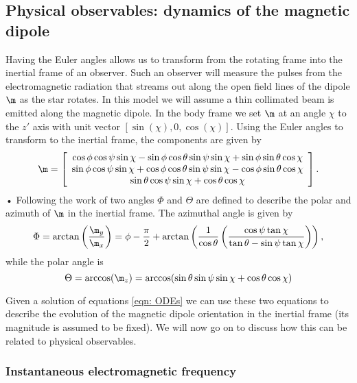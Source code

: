 \documentclass[/home/greg/Thesis/main/main.tex]{subfiles}
\begin{document}
\subsection{Physical observables: dynamics of the magnetic dipole} 
Having the Euler angles allows us to transform from the rotating frame into the
inertial frame of an observer. Such an observer will measure the pulses from
the electromagnetic radiation that streams out along the open field lines of
the dipole $\m$ as the star rotates. In this model we will assume a thin
collimated beam is emitted along the magnetic dipole. In the body frame we
set $\m$ at an angle $\chi$ to the $z'$ axis with unit vector $[\sin(\chi), 0,
\cos(\chi)]$.  Using the Euler angles to transform to the inertial frame, the
components are given by
\begin{equation}
\m = 
\left[\begin{array}{c}
\cos\phi\cos\psi\sin\chi - \sin\phi \cos \theta \sin \psi \sin \chi 
+ \sin \phi \sin \theta \cos \chi \\
\sin\phi\cos\psi\sin\chi + \cos\phi \cos \theta \sin \psi \sin \chi 
- \cos \phi \sin \theta \cos \chi \\
\sin\theta \cos\psi \sin\chi + \cos\theta \cos \chi
\end{array}\right].
\label{eqn: m inertial}
\end{equation}•
Following the work of  two angles $\Phi$ and $\Theta$ are
defined to describe the polar and azimuth of $\m$ in the inertial frame.
The azimuthal angle is given by 
\begin{equation}
    \Phi = \arctan\left(\frac{\m_{y}}{\m_{x}}\right) = 
\phi - \frac{\pi}{2} + \arctan\left(\frac{1}{\cos\theta}
                       \left(\frac{\cos\psi \tan \chi}{\tan\theta - 
                       \sin \psi \tan\chi }\right)\right),
\label{eqn: Phi}
\end{equation}
while the polar angle is
\begin{equation}
\Theta = \arccos(\m_{z}) = \arccos(\sin \theta \sin \psi \sin \chi + \cos \theta \cos \chi )
\label{eqn: Theta}
\end{equation}

Given a solution of equations \eqref{eqn: ODEs} we can use these two equations
to describe the evolution of the magnetic dipole orientation in the inertial
frame (its magnitude is assumed to be fixed). We will now go on to discuss how
this can be related to physical observables.

\subsubsection{Instantaneous electromagnetic frequency}
\end{document}
